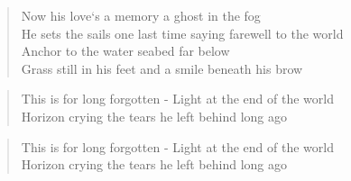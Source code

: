 \documentclass[9pt,a4paper,oneside, onecolumn]{article}
\begin{document}
\begin{verse}
Now his love`s a memory a ghost in the fog\\
He sets the sails one last time saying farewell to the world\\
Anchor to the water seabed far below\\
Grass still in his feet and a smile beneath his brow\\
\end{verse}

\begin{verse}
This is for long forgotten - Light at the end of the world\\
Horizon crying the tears he left behind long ago\\
\end{verse}

\begin{verse}
This is for long forgotten - Light at the end of the world\\
Horizon crying the tears he left behind long ago\\
\end{verse}
\end{document}
